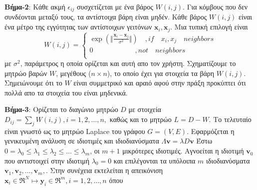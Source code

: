 \par
\textbf{Βήμα-2}: Κάθε ακμή $\epsilon_{ij}$ συσχετίζεται με ένα βάρος $W(i,j)$. Για κόμβους που δεν συνδέονται μεταξύ τους, τα αντίστοιχα βάρη είναι μηδέν. Κάθε βάρος $W(i,j)$ είναι ένα μέτρο της εγγύτητας των αντίστοιχων γειτόνων $\mathbf{x}_{i},\mathbf{x}_{j}$. Μια τυπική επιλογή είναι \\
\newline\hspace*{\fill}
\[W(i,j) = \begin{cases} \exp(\Vert \frac{\mathbf{x}_{i}-\mathbf{x}_{j}}{\sigma^{2}} \Vert) \quad ,if \quad x_{i},x_{j} \quad neighbors\\
               0  \quad \quad \quad \quad \quad \quad ,not \quad neighbors\\
            \end{cases} \]
\hspace*{\fill}\newline 
με $\sigma^{2}$, παράμετρος η οποία ορίζεται και αυτή απο τον χρήστη. Σχηματίζουμε το μητρώο βαρών $W$, μεγέθους ($n \times n$), το οποίο έχει για στοιχεία τα βάρη $W(i,j)$. Σημειώνουμε ότι το $W$ είναι συμμετρικό και αραιό αφού στην πράξη προκύπτει ότι πολλά απο τα στοιχεία του είναι μηδενικά.
\par
\textbf{Βήμα-3}: Ορίζεται το διαγώνιο μητρώο $D$ με στοιχεία $D_{ij}=\sum_{j} W(i,j),i=1,2,\ldots,n,$ καθώς και το μητρώο $L=D-W$. Το τελευταίο είναι γνωστό ως το μητρώο \textlatin{Laplace} του γράφου $G=(V,E)$. Εφαρμόζεται η γενικευμένη ανάλυση σε ιδιοτιμές και ιδιοδιανύσματα 
\newline\hspace*{\fill}
$ \Lambda \mathbf{v} =  \lambda D \mathbf{v} $
\hspace*{\fill}\newline 
Έστω $ 0 = \lambda_{0} \leq \lambda_{1} \leq \lambda_{2} \leq \ldots \leq \lambda_{m}$, οι $m+1$ μικρότερες ιδιοτιμές. Αγνοείται η ιδιοτιμή $\mathbf{v}_{0}$ που αντιστοιχεί στην ιδιοτιμή $\lambda_{0} = 0$ και επιλέγονται τα υπόλοιπα $m$ ιδιοδιανύσματα $\mathbf{v}_{1},\mathbf{v}_{2},\ldots,\mathbf{v}_{m},$. Στην συνέχεια εκτελείται η απεικόνιση
\newline\hspace*{\fill}
$\mathbf{x}_{i} \in \Re^{N} \mapsto \mathbf{y}_{i} \in \Re^{m}, i=1,2,\ldots,n$
\hspace*{\fill}\newline 
όπου 
\newline\hspace*{\fill}

